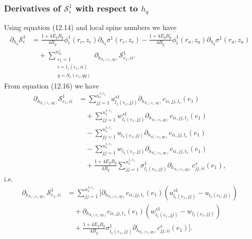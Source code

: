 \documentclass{article}
\begin{document}
\subsubsection{Derivatives of $\mathcal{S}_i^1$ with respect to $h_q$} %
Using equation (12.14) and local spine numbers we have
\begin{align}
\partial_{h_q} \mathcal{S}_i^1 &= \frac{1 + 4 E_g B_g}{4 B_g} \phi_i^1(r_c,z_c) \partial_{h_q} \sigma^1(r_c,z_c) - \frac{1 + 4 E_g B_g}{4 B_g} \phi_i^1(r_a,z_a) \partial_{h_q} \sigma^1(r_a,z_a) \nonumber\\
&\quad + \sum_{\substack{e_1=1\\ i=l_1(e_1,ii)\\ q=S_1(e_1,qq)}}^{n_{el}^1} \partial_{h_{S_1(e_1,qq)}} \mathcal{S}_{e_1,ii}^1. \tag{12.34}
\end{align}
From equation (12.16) we have
\begin{align}
\partial_{h_{S_1(e_1,qq)}} \mathcal{S}_{e_1,ii}^1 &= \sum_{jj=1}^{n_v^{1,e_1}} u_{l_1(e_1,jj)}^{s1} \partial_{h_{S_1(e_1,qq)}} c_{ii,jj,t_r}(e_1) \nonumber\\
&\quad + \sum_{jj=1}^{n_v^{1,e_1}} w_{l_1(e_1,jj)}^{s1} \partial_{h_{S_1(e_1,qq)}} c_{ii,jj,t_z}(e_1) \nonumber\\
&\quad - \sum_{jj=1}^{n_v^{1,e_1}} u_{l_1(e_1,jj)} \partial_{h_{S_1(e_1,qq)}} c_{ii,jj,t_r}(e_1) \nonumber\\
&\quad - \sum_{jj=1}^{n_v^{1,e_1}} w_{l_1(e_1,jj)} \partial_{h_{S_1(e_1,qq)}} c_{ii,jj,t_z}(e_1) \nonumber\\
&\quad + \frac{1 + 4 E_g B_g}{4 B_g} \sum_{jj=1}^{n_v^{1,e_1}} \sigma_{l_1(e_1,jj)}^1 \partial_{h_{S_1(e_1,qq)}} c_{jj,ii}^s(e_1), \tag{12.35}
\end{align}
i.e.
\begin{align}
\partial_{h_{S_1(e_1,qq)}} \mathcal{S}_{e_1,ii}^1 &= \sum_{jj=1}^{n_v^{1,e_1}} \Bigg[ \partial_{h_{S_1(e_1,qq)}} c_{ii,jj,t_r}(e_1) \left( u_{l_1(e_1,jj)}^{s1} - u_{l_1(e_1,jj)} \right) \nonumber\\
&\quad + \partial_{h_{S_1(e_1,qq)}} c_{ii,jj,t_z}(e_1) \left( w_{l_1(e_1,jj)}^{s1} - w_{l_1(e_1,jj)} \right) \nonumber\\
&\quad + \frac{1 + 4 E_g B_g}{4 B_g} \sigma_{l_1(e_1,jj)}^1 \partial_{h_{S_1(e_1,qq)}} c_{jj,ii}^s(e_1) \Bigg]. \tag{12.36}
\end{align}
\end{document}
